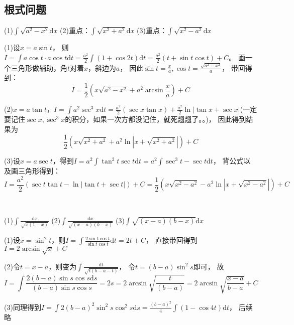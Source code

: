 \subsection{根式问题}

\begin{exercise}[三个基础公式的证明]
  (1)$\int \sqrt{a^2 - x^2}\mathrm{d} x$
  (2)重点：$\int \sqrt{x^2 + a^2}\mathrm{d} x$
  (3)重点：$\int \sqrt{x^2 - a^2}\mathrm{d} x$
\end{exercise}

\begin{solution}
  (1)设$x = a \sin t$，
  则$I = \int a \cos t \cdot a\cos t\mathrm{d} t = \frac{a^2}{2} \int (1 + \cos 2t)\mathrm{d} t = \frac{a^2}{2}(t + \sin t \cos t)+ C$。
  画一个三角形做辅助，角$t$对着$x$，斜边为$a$，
  因此$\sin t = \frac{x}{a}, \cos t = \frac{\sqrt{a^2 - x^2}}{a}$，
  带回得到：
  \begin{equation*}
    I = \frac{1}{2}(x \sqrt{a^2 - x^2} + a^2 \arcsin \frac{x}{a}) + C
  \end{equation*}

  (2)$x = a \tan t$，$I = \int a^2 \sec^3 x \mathrm{d} t =  \frac{a^2}{2} (\sec x \tan x ) + \frac{a^2}{2} \ln |\tan x + \sec x|$(一定要记住$\sec x, \sec^3 x$的积分，如果一次方都没记住，就死翘翘了。。)，
  因此得到结果为
  \begin{equation*}
    \frac{1}{2} (x \sqrt{x^2 + a^2} + a^2 \ln |x + \sqrt{x^2 + a^2}|) + C
  \end{equation*}

  (3)设$x = a \sec t$，得到$I = a^2\int \tan^2 t \sec t \mathrm{d}t = a^2 \int \sec^3 t - \sec t \mathrm{d} t$，
  背公式以及画三角形得到：
  \begin{equation*}
    I = \frac{a^2}{2}(\sec t \tan t - \ln |\tan t + \sec t|) + C = \frac{1}{2}(x \sqrt{x^2 - a^2} - a^2 \ln |x + \sqrt{x^2 - a^2}|) + C
  \end{equation*}
\end{solution}

~

\begin{exercise}[$(x-a)(b-x)$型]
  (1)$\int \frac{\mathrm{d} x}{\sqrt{x(1-x)}}$
  (2)$\int \frac{\mathrm{d} x}{\sqrt{(x -a)(b - x)}}$
  (3)$\int \sqrt{(x-a)(b-x)}\mathrm{d} x$
\end{exercise}

\begin{solution}
  (1)设$x = \sin^2 t$，则$I = \int \frac{2\sin t \cos t}{\sin t \cos t}\mathrm{d} t = 2t + C$，
  直接带回得到$I = 2 \arcsin \sqrt{x} + C$

  (2)令$t = x-a$，则变为$\int \frac{\mathrm{d} t}{\sqrt{t(b - a - t)}}$，
  令$t = (b - a) \sin^2 s$即可，
  故
  \begin{equation*}
    I = \int \frac{2(b-a)\sin s \cos s \mathrm{d} s}{(b-a) \sin s \cos s} = 2s = 2 \arcsin \sqrt{\frac{t}{(b-a)}} = 2 \arcsin  \sqrt{\frac{x-a}{b-a}}+C
  \end{equation*}

  (3)同理得到$I = \int 2(b-a)^2 \sin^2 s \cos^2 s\mathrm{d} s = \frac{(b-a)^2}{4} \int (1 - \cos 4t )\mathrm{d} t$，
  后续略
\end{solution}

